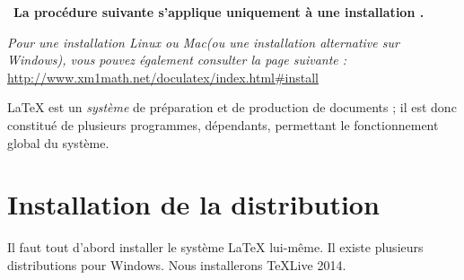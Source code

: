 \documentclass[10pt,openright,oneside,french]{book}
\newcommand{\texlive}{\TeX {\sf Live}\xspace}
\newcommand{\windows}{{\sf Windows}\xspace}
\newcommand{\mac}{{\sf Mac}\xspace}
\newcommand{\linux}{{\sf Linux}\xspace}
\begin{document}
\thispagestyle{empty}
\RegleEntete
{}

\ {\bfseries La procédure suivante s'applique uniquement à une installation .}\par
{\itshape Pour une installation \linux ou \mac (ou une installation alternative sur \windows), vous pouvez également consulter la page suivante :}
\url{http://www.xm1math.net/doculatex/index.html#install}\bigskip

\LaTeX{} est un \textit{système} de préparation et de production de documents ; il est donc constitué de plusieurs programmes, dépendants, permettant le fonctionnement global du système.

\section{Installation de la distribution}

Il faut tout d'abord installer le système \LaTeX{} lui-même. Il existe plusieurs distributions pour \windows. Nous installerons \texlive 2014.
\end{document}
